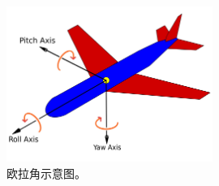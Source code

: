 \begin{figure}[h]
	\centering
	\includegraphics[width=0.6\textwidth]{./imgs/euler.jpg}
	\caption{欧拉角示意图。}
	\label{fig:euler}
\end{figure}
